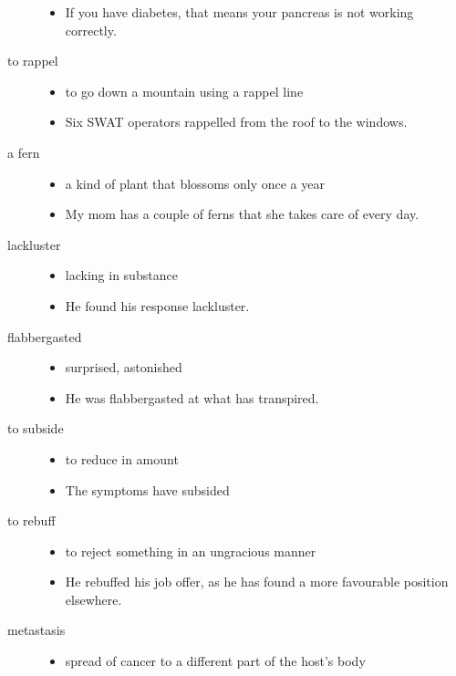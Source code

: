 \documentclass[a4paper]{article}
\begin{document}
\begin{description}
\begin{itemize}
        \item If you have diabetes, that means your pancreas is not working correctly.
    \end{itemize}
    \item[to rappel] \begin{itemize}
        \item to go down a mountain using a rappel line
        \item Six SWAT operators rappelled from the roof to the windows.
    \end{itemize}
    \item[a fern] \begin{itemize}
        \item a kind of plant that blossoms only once a year
        \item My mom has a couple of ferns that she takes care of every day.
    \end{itemize}
    \item[lackluster] \begin{itemize}
        \item lacking in substance
        \item He found his response lackluster.
    \end{itemize}
    \item[flabbergasted] \begin{itemize}
        \item surprised, astonished
        \item He was flabbergasted at what has transpired.
    \end{itemize}
    \pagebreak
    \item[to subside] \begin{itemize}
        \item to reduce in amount
        \item The symptoms have subsided
    \end{itemize}
    \item[to rebuff] \begin{itemize}
        \item to reject something in an ungracious manner
        \item He rebuffed his job offer, as he has found a more favourable position elsewhere.
    \end{itemize}
    \item[metastasis] \begin{itemize}
        \item spread of cancer to a different part of the host's body

\end{itemize}
\end{description}
\end{document}
